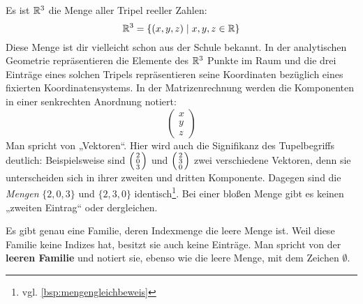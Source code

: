 \begin{bsp} \label{bsp:vektoren}
    Es ist $\mathbb R^3$ die Menge aller Tripel reeller Zahlen:
        \[ \mathbb R^3 = \{(x,y,z) \mid x,y,z\in \mathbb R \} \]
    Diese Menge ist dir vielleicht schon aus der Schule bekannt. In der analytischen Geometrie repräsentieren die Elemente des $\mathbb R^3$ Punkte im Raum und die drei Einträge eines solchen Tripels repräsentieren seine Koordinaten bezüglich eines fixierten Koordinatensystems. In der Matrizenrechnung werden die Komponenten in einer senkrechten Anordnung notiert:
    \[\begin{pmatrix}
        x \\ y \\ z 
    \end{pmatrix} \]
    Man spricht von „Vektoren“. Hier wird auch die Signifikanz des Tupelbegriffs deutlich: Beispielsweise sind $\begin{psmallmatrix} 2 \\ 0 \\ 3 \end{psmallmatrix}$ und $\begin{psmallmatrix} 2 \\ 3 \\ 0 \end{psmallmatrix}$ zwei verschiedene Vektoren, denn sie unterscheiden sich in ihrer zweiten und dritten Komponente. Dagegen sind die \emph{Mengen} $\{2,0,3\}$ und $\{2,3,0\}$ identisch\footnote{vgl. \cref{bsp:mengengleichbeweis}}. Bei einer bloßen Menge gibt es keinen „zweiten Eintrag“ oder dergleichen.
\end{bsp}


\begin{defin} \label{def:leerefam} 
    Es gibt genau eine Familie, deren Indexmenge die leere Menge ist. Weil diese Familie keine Indizes hat, besitzt sie auch keine Einträge. Man spricht von der \textbf{leeren Familie} und notiert sie, ebenso wie die leere Menge, mit dem Zeichen $\emptyset$.
\end{defin}


